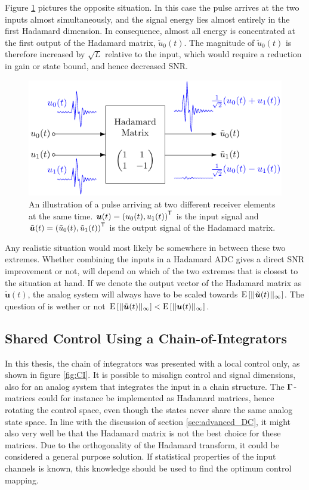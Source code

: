 Figure \ref{fig:hadamard_dimension} pictures the opposite situation. In this case the pulse arrives at the two inputs almost simultaneously, and the signal energy lies almost entirely in the first Hadamard dimension. In consequence, almost all energy is concentrated at the first output of the Hadamard matrix, $\tilde{u}_0(t)$. The magnitude of $\tilde{u}_0(t)$ is therefore increased by $\sqrt{L}$ relative to the input, which would require a reduction in gain or state bound, and hence decreased SNR.
\begin{figure}[htbp]
    \centering
    \includegraphics[width=\linewidth]{figures/05hadamard/hadamard_dimension.pdf}
    \caption{An illustration of a pulse arriving at two different receiver elements at the same time. $\bm{u}(t) = \left( u_0(t) , u_1(t) \right)^\mathsf{T}$ is the input signal and $\tilde{\bm{u}}(t) = \left( \tilde{u}_0(t) , \tilde{u}_1(t) \right)^\mathsf{T}$ is the output signal of the Hadamard matrix.}
    \label{fig:hadamard_dimension}
\end{figure}

Any realistic situation would most likely be somewhere in between these two extremes. Whether combining the inputs in a Hadamard ADC gives a direct SNR improvement or not, will depend on which of the two extremes that is closest to the situation at hand. If we denote the output vector of the Hadamard matrix as $\tilde{\bm{u}}(t)$, the analog system will always have to be scaled towards $\text{E} \left[ ||\tilde{\bm{u}}(t)||_{\infty} \right]$. The question of is wether or not $\text{E} \left[ ||\tilde{\bm{u}}(t)||_{\infty} \right] < \text{E} \left[ ||\bm{u}(t)||_{\infty} \right]$.



\subsection{Shared Control Using a Chain-of-Integrators}
In this thesis, the chain of integrators was presented with a local control only, as shown in figure \ref{fig:CI}. It is possible to misalign control and signal dimensions, also for an analog system that integrates the input in a chain structure. The $\bm{\Gamma}$-matrices could for instance be implemented as Hadamard matrices, hence rotating the control space, even though the states never share the same analog state space. In line with the discussion of section \ref{sec:advanced_DC}, it might also very well be that the Hadamard matrix is not the best choice for these matrices. Due to the orthogonality of the Hadamard transform, it could be considered a general purpose solution. If statistical properties of the input channels is known, this knowledge should be used to find the optimum control mapping.

